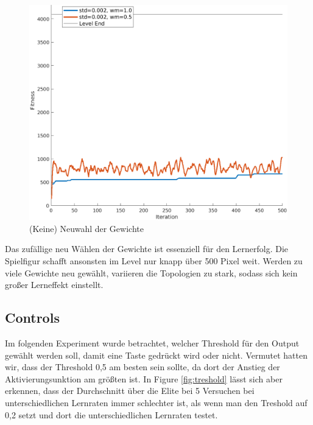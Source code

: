 \documentclass{hbrs-ecta-report}
\begin{document}
\begin{figure}[h!]
	\centering
	\includegraphics[width=\linewidth]{img/learningRates2.png}
	\caption{(Keine) Neuwahl der Gewichte}
	\label{fig:learningRates2} 
\end{figure}

Das zufällige neu Wählen der Gewichte ist essenziell für den Lernerfolg. Die Spielfigur schafft ansonsten im Level nur knapp über 500 Pixel weit. Werden zu viele Gewichte neu gewählt, variieren die Topologien zu stark, sodass sich kein großer Lerneffekt einstellt.

\newpage

\subsection{Controls}
Im folgenden Experiment wurde betrachtet, welcher Threshold für den Output gewählt werden soll, damit eine Taste gedrückt wird oder nicht. Vermutet hatten wir, dass der Threshold 0,5 am besten sein sollte, da dort der Anstieg der Aktivierungsunktion am größten ist. In Figure \ref{fig:treshold} lässt sich aber erkennen, dass der Durchschnitt über die Elite bei 5 Versuchen bei unterschiedlichen Lernraten immer schlechter ist, als wenn man den Treshold auf 0,2 setzt und dort die unterschiedlichen Lernraten testet. 
\end{document}
